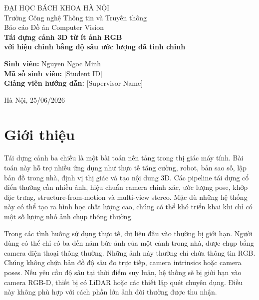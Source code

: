 \documentclass[12pt,a4paper]{article}
\begin{document}
\begin{titlepage}
\centering
{\Large ĐẠI HỌC BÁCH KHOA HÀ NỘI\\}
\vspace{0.2cm}
{\large Trường Công nghệ Thông tin và Truyền thông\\}
\vspace{1.6cm}
{\Large Báo cáo Đồ án Computer Vision\\}
\vspace{1.2cm}
{\LARGE\bfseries Tái dựng cảnh 3D từ ít ảnh RGB\\}
\vspace{0.2cm}
{\LARGE\bfseries với hiệu chỉnh bằng độ sâu ước lượng đã tinh chỉnh\\}
\vspace{2.0cm}
\begin{flushleft}
\hspace{2.8cm}\textbf{Sinh viên:} Nguyen Ngoc Minh\\
\hspace{2.8cm}\textbf{Mã số sinh viên:} [Student ID]\\
\hspace{2.8cm}\textbf{Giảng viên hướng dẫn:} [Supervisor Name]\\
\end{flushleft}
\vfill
{Hà Nội, 25/06/2026}
\end{titlepage}

\tableofcontents
\newpage
{}

\section{Giới thiệu}
Tái dựng cảnh ba chiều là một bài toán nền tảng trong thị giác máy tính. Bài toán này hỗ trợ nhiều ứng dụng như thực tế tăng cường, robot, bản sao số, lập bản đồ trong nhà, định vị thị giác và tạo nội dung 3D. Các pipeline tái dựng cổ điển thường cần nhiều ảnh, hiệu chuẩn camera chính xác, ước lượng pose, khớp đặc trưng, structure-from-motion và multi-view stereo. Mặc dù những hệ thống này có thể tạo ra hình học chất lượng cao, chúng có thể khó triển khai khi chỉ có một số lượng nhỏ ảnh chụp thông thường.

Trong các tình huống sử dụng thực tế, dữ liệu đầu vào thường bị giới hạn. Người dùng có thể chỉ có ba đến năm bức ảnh của một cảnh trong nhà, được chụp bằng camera điện thoại thông thường. Những ảnh này thường chỉ chứa thông tin RGB. Chúng không chứa bản đồ độ sâu đo trực tiếp, camera intrinsics hoặc camera poses. Nếu yêu cầu độ sâu tại thời điểm suy luận, hệ thống sẽ bị giới hạn vào camera RGB-D, thiết bị có LiDAR hoặc các thiết lập quét chuyên dụng. Điều này không phù hợp với cách phần lớn ảnh đời thường được thu nhận.
\end{document}

